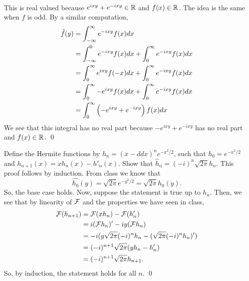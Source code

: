 \documentclass{article}
\begin{document}
\begin{enumerate}[(a)]
\begin{align*}
    \end{align*}
    This is real valued because $ e^{ixy}+ e^{-ixy} \in \RR$ and $f(x) \in \RR$. 
    \hop 
    The idea is the same when $f$ is odd. By a similar computation,
    \begin{align*}
        \hat{f}(y) &= \int_{-\infty}^\infty e^{-ixy}f(x)dx \\
        &= \int_{-\infty}^0 e^{-ixy}f(x)dx + \int_{0}^\infty e^{-ixy}f(x)dx\\
        &= \int_{0}^\infty e^{ixy}f(-x)dx + \int_{0}^\infty e^{-ixy}f(x)dx\\
        &= \int_{0}^\infty -e^{ixy}f(x)dx + \int_{0}^\infty e^{-ixy}f(x)dx\\
        &= \int_{0}^\infty\del{ -e^{ixy}+ e^{-ixy}}f(x)dx\\
    \end{align*}
    We see that this integral has no real part because $-e^{ixy}+ e^{-ixy}$ has no real part and $f(x)\in \RR$. \qed
\end{enumerate}


\newpage
{} Define the Hermite functions by $h_n = (x - d
dx
)^n e^{-x^2/2}$, such that $h_0 = e^{-x^2/2}$ and
$h_{n+1}(x) = xh_n(x) - h'_n(x)$. Show that $\hat{h}_n = (-i)^n\sqrt{2\pi} h_n$. \tri
\hop 
\solution
This proof follows by induction. From class we know that 
\[\hat{h_0}(y)=\sqrt{2\pi}e^{-y^2/2} = \sqrt{2\pi}h_0(y).\] 
So, the base case holds. Now, suppose the statement is true up to $h_n$. Then, we see that by linearity of $\cal{F}$ and the properties we have seen in class,
\begin{align*}
    \cal{F}(h_{n+1}) &= \cal{F}(xh_n)-\cal{F}(h_n')\\
    &= i(\cal{F}h_n)' - iy(\cal{F}h_n) \\
    &= -i(y\sqrt{2\pi}(-i)^n h_n - (\sqrt{2\pi}(-i)^n h_n)') \\
    &= (-i)^{n+1}\sqrt{2\pi}(yh_n - h_n')\\
    &= (-i)^{n+1}\sqrt{2\pi}h_{n+1}.
\end{align*}
So, by induction, the statement holds for all $n$. \qed
\end{document}
